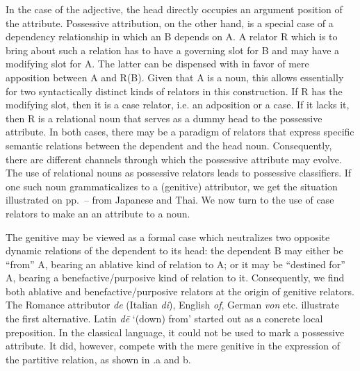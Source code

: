 In the case of the adjective, the head directly occupies an argument position of the attribute. Possessive attribution, on the other hand, is a special case of a dependency relationship in which an \np B depends on A.\label{page78} A relator R which is to bring about such a relation has to have a governing slot for B and may have a modifying slot for A. The latter can be dispensed with in favor of mere apposition between A and R(B). Given that A is a noun, this allows essentially for two syntactically distinct kinds of relators in this construction. If R has the modifying slot, then it is a case relator, i.e. an adposition or a case. If it lacks it, then R is a relational noun that serves as a dummy head to the possessive attribute. In both cases, there may be a paradigm of relators that express specific semantic relations between the dependent \np and the head noun. Consequently, there are different channels through which the possessive attribute may evolve. The use of relational nouns as possessive relators leads to possessive classifiers. If one such noun grammaticalizes to a (genitive) attributor, we get the situation illustrated on pp.~\pageref{page74b}--\pageref{page75}\chk%
  from Japanese and Thai. We now turn to the use of case relators to make an \np an attribute to a noun.

The genitive may be viewed as a formal case which neutralizes two opposite dynamic relations of the dependent \np to its head: the dependent B may either be “from” A, bearing an ablative kind of relation to A; or it may be “destined for” A, bearing a benefactive/purposive kind of relation to it. Consequently, we find both ablative and benefactive/purposive relators at the origin of genitive relators.\label{page78b} The Romance attributor \textit{de} (Italian \textit{di}), English \textit{of}, German \textit{von} etc. illustrate the first alternative. Latin \textit{d\=e} ‘(down) from’ started out as a concrete local preposition. In the classical language, it could not be used to mark a possessive attribute. It did, however, compete with the mere genitive in the expression of the partitive relation, as shown in .a and b.

